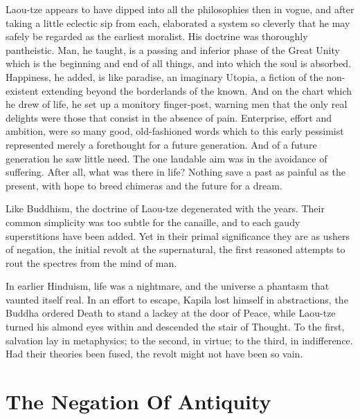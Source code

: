 \documentclass[]{book}
\begin{document}
Laou-tze appears to have dipped into all the philosophies then in vogue,
and after taking a little eclectic sip from each, elaborated a system so
cleverly that he may safely be regarded as the earliest moralist. His
doctrine was thoroughly pantheistic. Man, he taught, is a passing and
inferior phase of the Great Unity which is the beginning and end of all
things, and into which the soul is absorbed. Happiness, he added, is
like paradise, an imaginary Utopia, a fiction of the non-existent
extending beyond the borderlands of the known. And on the chart which he
drew of life, he set up a monitory finger-post, warning men that the
only real delights were those that consist in the absence of pain.
Enterprise, effort and ambition, were so many good, old-fashioned words
which to this early pessimist represented merely a forethought for a
future generation. And of a future generation he saw little need. The
one laudable aim was in the avoidance of suffering. After all, what was
there in life? Nothing save a past as painful as the present, with hope
to breed chimeras and the future for a dream.

Like Buddhism, the doctrine of Laou-tze degenerated with the years.
Their common simplicity was too subtle for the canaille, and to each
gaudy superstitions have been added. Yet in their primal significance
they are as ushers of negation, the initial revolt at the supernatural,
the first reasoned attempts to rout the spectres from the mind of man.

In earlier Hinduism, life was a nightmare, and the universe a phantasm
that vaunted itself real. In an effort to escape, Kapila lost himself in
abstractions, the Buddha ordered Death to stand a lackey at the door of
Peace, while Laou-tze turned his almond eyes within and descended the
stair of Thought. To the first, salvation lay in metaphysics; to the
second, in virtue; to the third, in indifference. Had their theories
been fused, the revolt might not have been so vain.

\chapter{The Negation Of Antiquity}\label{the-negation-of-antiquity}
\end{document}
